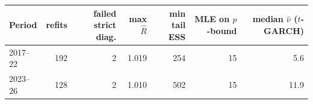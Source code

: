 \begin{tabular}{lrrrrrr}\toprule
Period & refits & failed strict diag. & max $\hat R$ & min tail ESS & MLE on $p$-bound & median $\hat\nu$ ($t$-GARCH)\\\midrule
2017--22 & 192 & 2 & 1.019 & 254 & 15 & 5.6 \\
2023--26 & 128 & 2 & 1.010 & 502 & 15 & 11.9 \\
\bottomrule\end{tabular}
